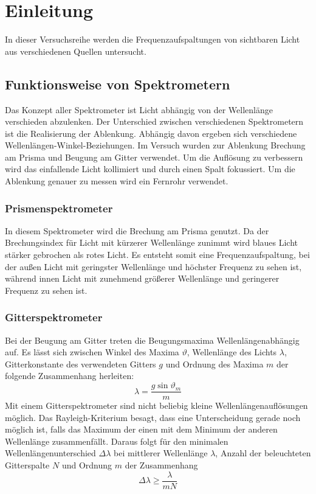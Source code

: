 \section{Einleitung}
In dieser Versuchsreihe werden die Frequenzaufspaltungen von sichtbaren Licht aus verschiedenen Quellen untersucht. 

\subsection{Funktionsweise von Spektrometern}
Das Konzept aller Spektrometer ist Licht abhängig von der Wellenlänge verschieden abzulenken. Der Unterschied zwischen verschiedenen Spektrometern ist die Realisierung der Ablenkung. Abhängig davon ergeben sich verschiedene Wellenlängen-Winkel-Beziehungen. Im Versuch wurden zur Ablenkung Brechung am Prisma und Beugung am Gitter verwendet. Um die Auflösung zu verbessern wird das einfallende Licht kollimiert und durch einen Spalt fokussiert. Um die Ablenkung genauer zu messen wird ein Fernrohr verwendet.
\subsubsection{Prismenspektrometer}
In diesem Spektrometer wird die Brechung am Prisma genutzt. Da der Brechungsindex für Licht mit kürzerer Wellenlänge zunimmt wird blaues Licht stärker gebrochen als rotes Licht. Es entsteht somit eine Frequenzaufspaltung, bei der außen Licht mit geringster Wellenlänge und höchster Frequenz zu sehen ist, während innen Licht mit zunehmend größerer Wellenlänge und geringerer Frequenz zu sehen ist.
\subsubsection{Gitterspektrometer}
Bei der Beugung am Gitter treten die Beugungsmaxima Wellenlängenabhängig auf. Es lässt sich zwischen Winkel des Maxima $ \vartheta $, Wellenlänge des Lichts $ \lambda $, Gitterkonstante des verwendeten Gitters $ g $ und Ordnung des Maxima $ m $ der folgende Zusammenhang herleiten:
\begin{equation}
	\lambda = \frac{g\sin\vartheta_m}{m} \label{eq:theo:beug}
\end{equation}
Mit einem Gitterspektrometer sind nicht beliebig kleine Wellenlängenauflösungen möglich. Das  Rayleigh-Kriterium besagt, dass eine Unterscheidung gerade noch möglich ist, falls das Maximum der einen mit dem Minimum der anderen Wellenlänge zusammenfällt. Daraus folgt für den minimalen Wellenlängenunterschied $ \Delta \lambda $ bei mittlerer Wellenlänge $ \lambda $, Anzahl der beleuchteten Gitterspalte $ N $ und Ordnung $ m $ der Zusammenhang
\begin{equation}
	\Delta\lambda \geq \frac{\lambda}{mN}
\end{equation}
